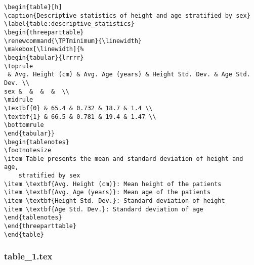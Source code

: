 \documentclass[11pt]{article}
\begin{document}
\begin{Verbatim}[tabsize=4]
\begin{table}[h]
\caption{Descriptive statistics of height and age stratified by sex}
\label{table:descriptive_statistics}
\begin{threeparttable}
\renewcommand{\TPTminimum}{\linewidth}
\makebox[\linewidth]{%
\begin{tabular}{lrrrr}
\toprule
 & Avg. Height (cm) & Avg. Age (years) & Height Std. Dev. & Age Std. Dev. \\
sex &  &  &  &  \\
\midrule
\textbf{0} & 65.4 & 0.732 & 18.7 & 1.4 \\
\textbf{1} & 66.5 & 0.781 & 19.4 & 1.47 \\
\bottomrule
\end{tabular}}
\begin{tablenotes}
\footnotesize
\item Table presents the mean and standard deviation of height and age,
	stratified by sex
\item \textbf{Avg. Height (cm)}: Mean height of the patients
\item \textbf{Avg. Age (years)}: Mean age of the patients
\item \textbf{Height Std. Dev.}: Standard deviation of height
\item \textbf{Age Std. Dev.}: Standard deviation of age
\end{tablenotes}
\end{threeparttable}
\end{table}

\end{Verbatim}

\subsubsection*{table\_1.tex}
\end{document}
